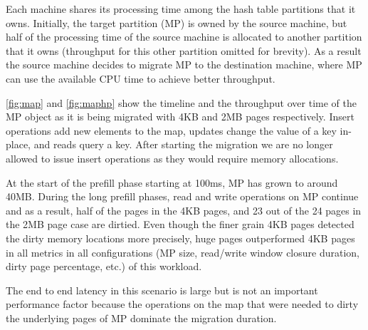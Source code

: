 Each machine shares its processing time among the hash table partitions that
it owns. Initially, the target partition (MP) is owned by the source machine, but half of
the processing time of the source machine is allocated to another partition that
it owns (throughput for this other partition omitted for brevity). As a result
the source machine decides to migrate MP to the destination machine, where MP
can use the available CPU time to achieve better throughput.

\autoref{fig:map} and \autoref{fig:maphp} show the timeline and the throughput
over time of the MP object as it is being migrated with 4KB and 2MB pages
respectively. Insert operations add new elements to the map, updates change
the value of a key in-place, and reads query a key. After starting the migration
we are no longer allowed to issue insert operations as they would require
memory allocations.

At the start of the prefill phase starting at 100ms, MP has grown to around 40MB.
During the long prefill phases, read and write operations on MP continue and as
a result, half of the pages in the 4KB pages, and 23 out of the 24 pages in the
2MB page case are dirtied. Even though the finer grain 4KB pages detected the
dirty memory locations more precisely, huge pages outperformed 4KB pages in all
metrics in all configurations (MP size, read/write window closure duration,
dirty page percentage, etc.) of this workload.

The end to end latency in this scenario is large but is not an important
performance factor because the operations
on the map that were needed to dirty the underlying pages of MP dominate
the migration duration.



